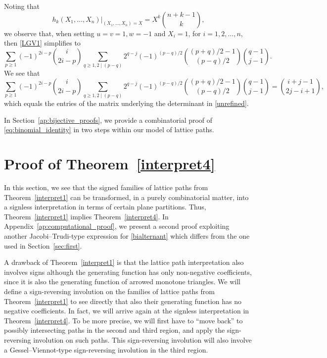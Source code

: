 \documentclass[12pt]{amsart}
\theoremstyle{definition}
\numberwithin{equation}{section}
\begin{document}
Noting that 
\begin{equation}
	\label{hspecial}  
	\left. h_{k}(X_1,\ldots,X_n) \right|_{(X_1,\ldots,X_n)=X} = X^k \binom{n+k-1}{k},
\end{equation} 
we observe that, when setting $u=v=1, w=-1$ and $X_i=1$, for $i=1,2,\ldots,n$, then \eqref{LGV1} simplifies to 
\begin{equation}
	\label{specialized} 
	\sum_{p \ge 1} (-1)^{2i-p} \binom{i}{2i-p}  \sum_{q \ge 1,2 \mid (p-q)}  2^{q-j} (-1)^{(p-q)/2} \binom{(p+q)/2-1}{(p-q)/2} \binom{q-1}{j-1}. 
\end{equation}
We see that
\begin{equation}\label{eq:binomial_identity}
	\sum_{p \ge 1} (-1)^{2i-p} \binom{i}{2i-p}  \sum_{q \ge 1,2 \mid (p-q)}  2^{q-j} (-1)^{(p-q)/2} \binom{(p+q)/2-1}{(p-q)/2} \binom{q-1}{j-1}
	=  \binom{i+j-1}{2j-i+1},
\end{equation}
which equals the entries of the matrix underlying the determinant in \eqref{unrefined}.

In Section~\ref{ap:bijective_proofs}, we provide a combinatorial proof of \eqref{eq:binomial_identity} in two steps within our model of lattice paths.

\section{\texorpdfstring{Proof of Theorem~\ref{interpret4}}{Proof of Theorem~2.2}}
\label{sec:third} 

In this section, we see that the signed families of lattice paths from Theorem~\ref{interpret1} can be transformed, in a purely combinatorial matter, into a signless interpretation in terms of certain plane partitions. Thus, Theorem~\ref{interpret1} implies Theorem~\ref{interpret4}. In Appendix~\ref{ap:computational_proof}, we present a second proof exploiting another Jacobi--Trudi-type expression for \eqref{bialternant} which differs from the one used in Section~\ref{sec:first}.

A drawback of Theorem~\ref{interpret1} is that the lattice path interpretation also involves signs although the generating function has only non-negative  coefficients, since it is also the generating function of arrowed monotone triangles. We will define a sign-reversing involution on the families of lattice paths from Theorem~\ref{interpret1} to see directly that also their generating function has no negative coefficients. In fact, we will arrive again at the signless interpretation in Theorem~\ref{interpret4}.
To be more precise, we will first have to ``move back'' to possibly intersecting paths in the second and third region, and apply the sign-reversing involution on such paths. This sign-reversing involution will also involve a Gessel--Viennot-type sign-reversing involution in the third region. 
\end{document}
